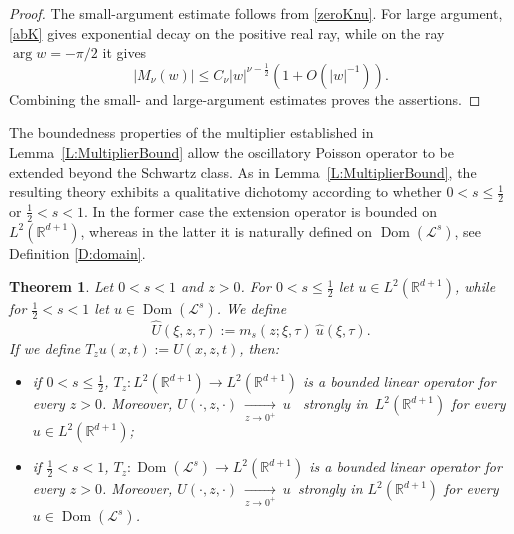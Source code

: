 \documentclass[11pt,letter]{amsart}
\def \RNu {\mathbb{R}^{d+1}}
\numberwithin{equation}{section}
\newcommand{\Le}{\mathcal L}
\newcommand{\Dom}{\operatorname{Dom}}
\newtheorem{theorem}{Theorem}[section]
\numberwithin{equation}{section}
\begin{document}
\begin{proof}
The small-argument estimate follows from \eqref{zeroKnu}. For large argument,
\eqref{abK} gives exponential decay on the positive real ray, while on the
ray $\arg w=-\pi/2$ it gives
\[
|M_\nu(w)|\le C_\nu |w|^{\nu-\frac12}(1+O(|w|^{-1})).
\]
Combining the small- and large-argument estimates proves the assertions.
\end{proof}



The boundedness properties of the multiplier established in Lemma~\ref{L:MultiplierBound}
allow the oscillatory Poisson operator to be extended beyond the
Schwartz class. As in Lemma~\ref{L:MultiplierBound}, the resulting theory exhibits a
qualitative dichotomy according to whether \(0<s\le\frac12\) or
\(\frac12<s<1\). In the former case the extension operator is bounded on
\(L^2(\mathbb R^{d+1})\), whereas in the latter it is naturally defined
on $\Dom(\Le^s)$, see Definition \ref{D:domain}.

\begin{theorem}\label{T:L2Extension}
Let $0<s<1$ and $z>0$. For $0<s\le\frac12$ let $u\in L^2(\RNu)$, while for $\frac12<s<1$ let $u\in\Dom(\Le^s)$. We define 
\[
\widehat{U}(\xi,z,\tau)
:=
m_s(z;\xi,\tau)\ \widehat u(\xi,\tau).
\]
If we define $T_z u(x,t) := U(x,z,t)$, then:
\begin{itemize}
\item[(i)] if $0<s\le\frac12$, $T_z:L^2(\RNu)
\longrightarrow
L^2(\RNu)$
is a bounded linear operator for every $z>0$. Moreover,  $U(\cdot,z,\cdot)\ 
\underset{z\to 0^+}{\longrightarrow}\ 
u$
\ strongly in\ $L^2(\mathbb R^{d+1})$ for every
$u\in L^2(\RNu)$;
\item[(ii)] if $\frac12<s<1$,  $T_z:\Dom(\Le^s)
\longrightarrow
L^2(\RNu)$
is a bounded linear operator for every $z>0$. Moreover, $U(\cdot,z,\cdot)\ 
\underset{z\to 0^+}{\longrightarrow}\ 
u$\ strongly in $L^2(\RNu)$ for every
$u\in\Dom(\Le^s)$.
\end{itemize}
\end{theorem}
\end{document}
